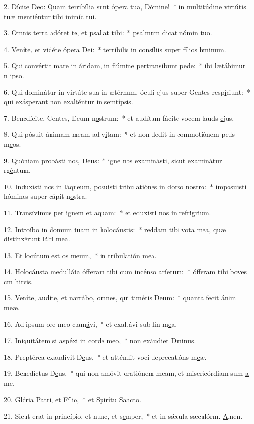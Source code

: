 2. Dícite Deo: Quam terribília sunt ópera tua, D\uline{ó}mine!~* in multitúdine virtútis tuæ mentiéntur tibi inimíc t\uline{u}i.\par 
3. Omnis terra adóret te, et psallat t\uline{i}bi:~* psalmum dicat nómin t\uline{u}o.\par 
4. Veníte, et vidéte ópera D\uline{e}i:~* terríbilis in consíliis super fílios hm\uline{i}num.\par 
5. Qui convértit mare in áridam, in flúmine pertransíbunt p\uline{e}de:~* ibi lætábimur n \uline{i}pso.\par 
6. Qui dominátur in virtúte sua in ætérnum, óculi ejus super Gentes resp\uline{í}ciunt:~* qui exásperant non exalténtur in semt\uline{í}psis.\par 
7. Benedícite, Gentes, Deum n\uline{o}strum:~* et audítam fácite vocem lauds \uline{e}jus,\par 
8. Qui pósuit ánimam meam ad v\uline{i}tam:~* et non dedit in commotiónem peds m\uline{e}os.\par 
9. Quóniam probásti nos, D\uline{e}us:~* igne nos examinásti, sicut examinátur rg\uline{é}ntum.\par 
10. Induxísti nos in láqueum, posuísti tribulatiónes in dorso n\uline{o}stro:~* imposuísti hómines super cápit n\uline{o}stra.\par 
11. Transívimus per ignem et \uline{a}quam:~* et eduxísti nos in refrigr\uline{i}um.\par 
12. Introíbo in domum tuam in holoc\uline{áu}stis:~* reddam tibi vota mea, quæ distinxérunt lábi m\uline{e}a.\par 
13. Et locútum est os m\uline{e}um,~* in tribulatión m\uline{e}a.\par 
14. Holocáusta medulláta ófferam tibi cum incénso ar\uline{í}etum:~* ófferam tibi boves cm h\uline{i}rcis.\par 
15. Veníte, audíte, et narrábo, omnes, qui timétis D\uline{e}um:~* quanta fecit ánim m\uline{e}æ.\par 
16. Ad ipsum ore meo clam\uline{á}vi,~* et exaltávi sub lin m\uline{e}a.\par 
17. Iniquitátem si aspéxi in corde m\uline{e}o,~* non exáudiet Dm\uline{i}nus.\par 
18. Proptérea exaudívit D\uline{e}us,~* et atténdit voci deprecatións m\uline{e}æ.\par 
19. Benedíctus D\uline{e}us,~* qui non amóvit oratiónem meam, et misericórdiam sum \uline{a} me.\par 
20. Glória Patri, et F\uline{í}lio,~* et Spirítu S\uline{a}ncto.\par 
21. Sicut erat in princípio, et nunc, et s\uline{e}mper,~* et in sǽcula sæculórm. \uline{A}men.\par 
